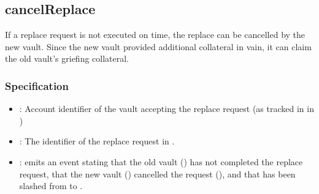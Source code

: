 \documentclass[a4paper,10pt,english]{sphinxmanual}
\begin{document}
\subsection{cancelReplace}
\label{\detokenize{spec/replace:cancelreplace}}\label{\detokenize{spec/replace:id11}}
If a replace request is not executed on time, the replace can be cancelled by the new vault. Since the new vault provided additional collateral in vain, it can claim the old vault’s griefing collateral.


\subsubsection{Specification}
\label{\detokenize{spec/replace:id12}}


\begin{itemize}
\item {} 
: Account identifier of the vault accepting the replace request (as tracked in  in {\hyperref[\detokenize{spec/vault-registry:vault-registry}]{}})

\item {} 
: The identifier of the replace request in .

\end{itemize}

\begin{itemize}
\item {} 
: emits an event stating that the old vault () has not completed the replace request, that the new vault () cancelled the  request (), and that  has been slashed from  to .

\end{itemize}
\end{document}
